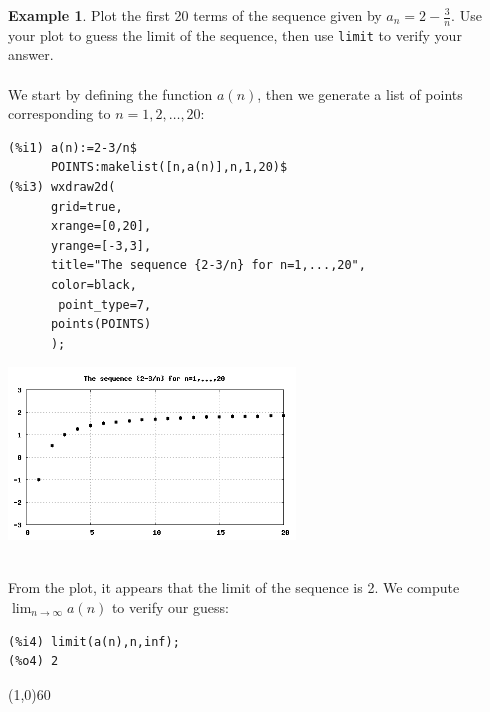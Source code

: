 \documentclass[10.5pt,twoside]{report}
\theoremstyle{definition}
\newtheorem{exmp}{Example}[section]
\begin{document}
\begin{exmp} Plot the first 20 terms of the sequence given by $a_n=2-\frac{3}{n}$.  Use your plot to guess the limit of the sequence, then use \verb|limit| to verify your answer.\\
${}$\\

We start by defining the function $a(n)$, then we generate a list of points corresponding to $n=1,2,\dots ,20$:

\begin{verbatim}
(%i1) a(n):=2-3/n$
      POINTS:makelist([n,a(n)],n,1,20)$
(%i3) wxdraw2d(
      grid=true,
      xrange=[0,20],
      yrange=[-3,3],
      title="The sequence {2-3/n} for n=1,...,20",
      color=black,
       point_type=7,
      points(POINTS)
      );
\end{verbatim}

\includegraphics[width=3in]{example_6_1_1_1}

${}$\\

From the plot, it appears that the limit of the sequence is 2.  We compute $\lim_{n\to \infty} a(n)$ to verify our guess:

\begin{verbatim}
(%i4) limit(a(n),n,inf);
(%o4) 2
\end{verbatim}

\end{exmp} 

\line(1,0){60}
\linethickness{0.5mm}
\pagebreak
\end{document}
